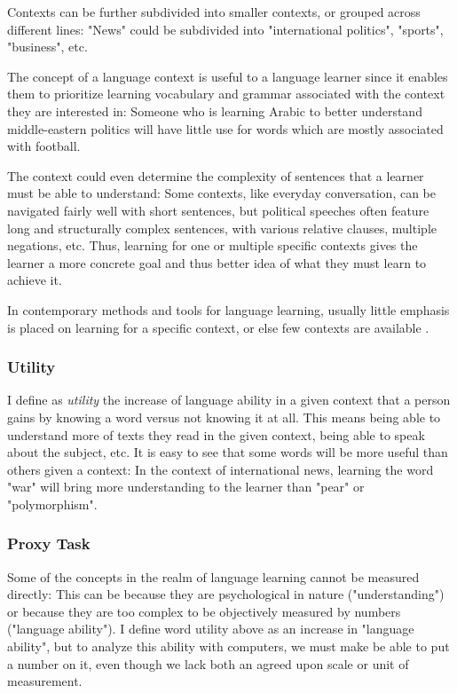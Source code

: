 Contexts can be further subdivided into smaller contexts, or grouped across different lines:
"News" could be subdivided into "international politics", "sports", "business", etc.

The concept of a language context is useful to a language learner since it enables them to prioritize learning vocabulary and grammar associated with the context they are interested in:
Someone who is learning Arabic to better understand middle-eastern politics will have little use for words which are mostly associated with football.

The context could even determine the complexity of sentences that a learner must be able to understand:
Some contexts, like everyday conversation, can be navigated fairly well with short sentences, but political speeches often feature long and structurally complex sentences, with various relative clauses, multiple negations, etc.
Thus, learning for one or multiple specific contexts gives the learner a more concrete goal and thus better idea of what they must learn to achieve it.

In contemporary methods and tools for language learning, usually little emphasis is placed on learning for a specific context, or else few contexts are available .

\subsubsection{Utility}
I define as \textit{utility} the increase of language ability in a given context that a person gains by knowing a word versus not knowing it at all.
This means being able to understand more of texts they read in the given context, being able to speak about the subject, etc.
It is easy to see that some words will be more useful than others given a context:
In the context of international news, learning the word "war" will bring more understanding to the learner than "pear" or "polymorphism".

\subsubsection{Proxy Task}
Some of the concepts in the realm of language learning cannot be measured directly:
This can be because they are psychological in nature ("understanding") or because they are too complex to be objectively measured by numbers ("language ability").
I define word utility above as an increase in "language ability", but to analyze this ability with computers, we must make be able to put a number on it, even though we lack both an agreed upon scale or unit of measurement.

